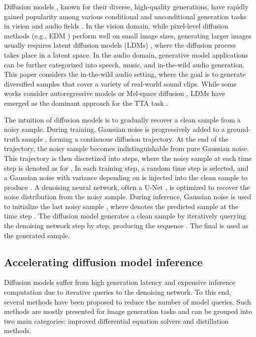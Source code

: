 \documentclass{article}
\begin{document}
Diffusion models \cite{diffusion, ddpm}, known for their diverse, high-quality generations, have rapidly gained popularity among various conditional and unconditional generation tasks in vision and audio fields \cite{sd, edm, audioldm, noise2music}. In the vision domain, while pixel-level diffusion methods (e.g., EDM \cite{edm}) perform well on small image sizes, generating larger images usually requires latent diffusion models (LDMs) \cite{ldm}, where the diffusion process takes place in a latent space. In the audio domain, generative model applications can be further categorized into speech, music, and in-the-wild audio generation. This paper considers the in-the-wild audio setting, where the goal is to generate diversified samples that cover a variety of real-world sound clips. While some works consider autoregressive models \cite{audiogen} or Mel-space diffusion \cite{riffusion}, LDMs have emerged as the dominant approach for the TTA task \cite{tango, diffsound, audioldm, audioldm-2, make-an-audio, make-an-audio-2, codi}. 

The intuition of diffusion models is to gradually recover a clean sample from a noisy sample. During training, Gaussian noise is progressively added to a ground-truth sample , forming a continuous diffusion trajectory. At the end of the trajectory, the noisy sample becomes indistinguishable from pure Gaussian noise. This trajectory is then discretized into  steps, where the noisy sample at each time step is denoted as  for . In each training step, a random time step  is selected, and a Gaussian noise with variance depending on  is injected into the clean sample to produce . A denoising neural network, often a U-Net \cite{unet}, is optimized to recover the noise distribution from the noisy sample. During inference, Gaussian noise is used to initialize the last noisy sample , where  denotes the predicted sample at the time step . The diffusion model generates a clean sample by iteratively querying the denoising network step by step, producing the sequence . The final  is used as the generated sample.


\subsection{Accelerating diffusion model inference}

Diffusion models suffer from high generation latency and expensive inference computation due to iterative queries to the denoising network. To this end, several methods have been proposed to reduce the number of model queries. Such methods are mostly presented for image generation tasks and can be grouped into two main categories: improved differential equation solvers and distillation methods. 
\end{document}
